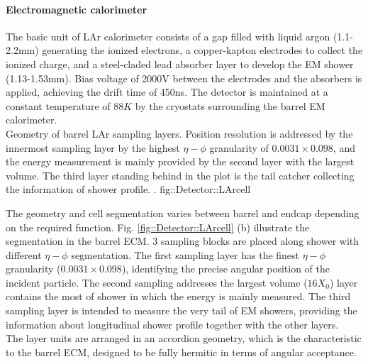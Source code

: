 \paragraph{Electromagnetic calorimeter}
%
The basic unit of LAr calorimeter consists of a gap filled with liquid argon (1.1-2.2mm) generating the ionized electrons, a copper-kapton electrodes to collect the ionized charge, 
and a steel-claded lead absorber layer to develop the EM shower (1.13-1.53mm). Bias voltage of 2000V between the electrodes and the absorbers is applied, achieving the drift time of 450ns. The detector is maintained at a constant temperature of $88K$ by the cryostats surrounding the barrel EM calorimeter. \\

{Geometry of barrel LAr sampling layers. 
Position resolution is addressed by the innermost sampling layer by the highest $\eta-\phi$ granularity of $0.0031\times0.098$,
and the energy measurement is mainly provided by the second layer with the largest volume.
The third layer standing behind in the plot is the tail catcher collecting the information of shower profile.
    \cite{ATLAS_TDR}.}
{fig::Detector::LArcell}

The geometry and cell segmentation varies between barrel and endcap depending on the required function.
Fig. \ref{fig::Detector::LArcell} (b) illustrate the segmentation in the barrel ECM. 3 sampling blocks are placed along shower with different $\eta-\phi$ segmentation.
The first sampling layer has the finest $\eta-\phi$ granularity ($0.0031\times0.098$), identifying the precise angular position of the incident particle. The second sampling addresses the largest volume ($16X_0$) layer contains the most of shower in which the energy is mainly measured. The third sampling layer is intended to measure the very tail of EM showers, providing the information about longitudinal shower profile together with the other layers. \\
The layer units are arranged in an accordion geometry, which is the characteristic to the barrel ECM, designed to be fully hermitic in terms of angular acceptance. \\

